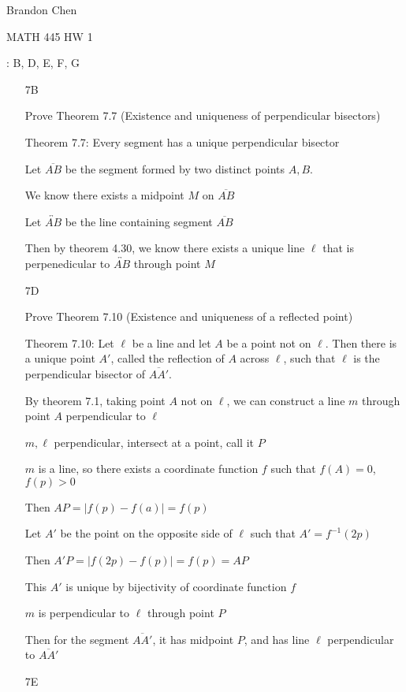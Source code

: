 \documentclass[11pt]{article}
\newcommand{\lines}[1]{\overleftrightarrow{#1}}
\newcommand{\segment}[1]{\overline{#1}}
\begin{document}
\noindent Brandon Chen

\noindent MATH 445 HW 1

: B, D, E, F, G

\begin{itemize}
\item[7B]

	Prove Theorem 7.7 (Existence and uniqueness of perpendicular bisectors)

	Theorem 7.7: Every segment has a unique perpendicular bisector

	Let $\segment{AB}$ be the segment formed by two distinct points $A,B$.

		We know there exists a midpoint $M$ on $\segment{AB}$

		Let $\lines{AB}$ be the line containing segment $\segment{AB}$

		Then by theorem 4.30, we know there exists a unique line $\ell$ that is perpenedicular to $\lines{AB}$ through point $M$

\item[7D]

	Prove Theorem 7.10 (Existence and uniqueness of a reflected point)

	Theorem 7.10: Let $\ell$ be a line and let $A$ be a point not on $\ell$. Then there is a unique point $A'$, called the reflection of $A$ across $\ell$, such that $\ell$ is the perpendicular bisector of $\segment{AA'}$.

	By theorem 7.1, taking point $A$ not on $\ell$, we can construct a line $m$ through point $A$ perpendicular to $\ell$

	$m, \ell$ perpendicular, intersect at a point, call it $P$

		$m$ is a line, so there exists a coordinate function $f$ such that $f(A) = 0$, $f(p) > 0$

		Then $AP = |f(p) - f(a)| = f(p)$

		Let $A'$ be the point on the opposite side of $\ell$ such that $A' = f^{-1} (2p)$

		Then $A'P = |f(2p) - f(p)| = f(p) = AP$

		This $A'$ is unique by bijectivity of coordinate function $f$

		$m$ is perpendicular to $\ell$ through point $P$

		Then for the segment $\segment{AA'}$, it has midpoint $P$, and has line $\ell$ perpendicular to $\segment{AA'}$

\item[7E]


\end{itemize}
\end{document}
